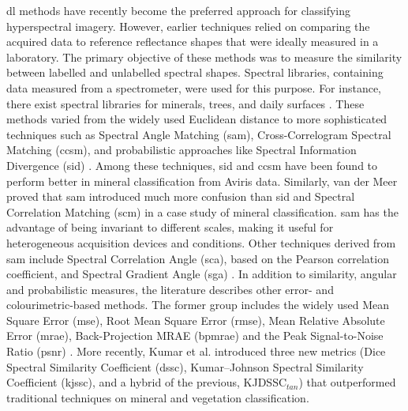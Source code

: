 \acrshort{dl} methods have recently become the preferred approach for classifying hyperspectral imagery. However, earlier techniques relied on comparing the acquired data to reference reflectance shapes that were ideally measured in a laboratory. The primary objective of these methods was to measure the similarity between labelled and unlabelled spectral shapes. Spectral libraries, containing data measured from a spectrometer, were used for this purpose. For instance, there exist spectral libraries for minerals, trees, and daily surfaces \cite{kokaly_usgs_2017, dutta_characterizing_2017, matusik_data-driven_2003}. These methods varied from the widely used Euclidean distance to more sophisticated techniques such as Spectral Angle Matching (\acrshort{sam}), Cross-Correlogram Spectral Matching (\acrshort{ccsm}), and probabilistic approaches like Spectral Information Divergence (\acrshort{sid}) \cite{pu_hyperspectral_2017}. Among these techniques, \acrshort{sid} and \acrshort{ccsm} have been found to perform better in mineral classification from Aviris data. Similarly, van der Meer \cite{van_der_meer_effectiveness_2006} proved that \acrshort{sam} introduced much more confusion than \acrshort{sid} and Spectral Correlation Matching (\acrshort{scm}) in a case study of mineral classification. \acrshort{sam} has the advantage of being invariant to different scales, making it useful for heterogeneous acquisition devices and conditions. Other techniques derived from \acrshort{sam} include Spectral Correlation Angle (\acrshort{sca}), based on the Pearson correlation coefficient, and Spectral Gradient Angle (\acrshort{sga}) \cite{ren_novel_2022}. In addition to similarity, angular and probabilistic measures, the literature describes other error- and colourimetric-based methods. The former group includes the widely used Mean Square Error (\acrshort{mse}), Root Mean Square Error (\acrshort{rmse}), Mean Relative Absolute Error (\acrshort{mrae}), Back-Projection MRAE (\acrshort{bpmrae}) and the Peak Signal-to-Noise Ratio (\acrshort{psnr}) \cite{agarla_analysis_2021}. More recently, Kumar et al. \cite{kumar_new_2021} introduced three new metrics (Dice Spectral Similarity Coefficient (\acrshort{dssc}), Kumar–Johnson Spectral Similarity Coefficient (\acrshort{kjssc}), and a hybrid of the previous, KJDSSC$_{\textit{tan}}$) that outperformed traditional techniques on mineral and vegetation classification.

